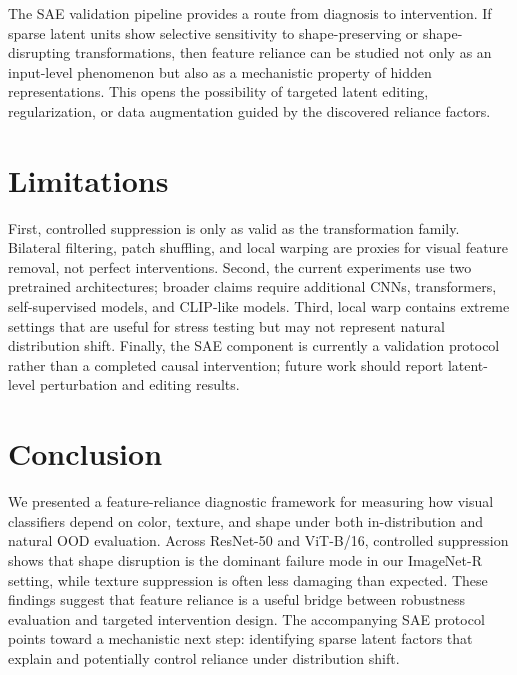 \documentclass[letterpaper]{article}
\begin{document}
The SAE validation pipeline provides a route from diagnosis to intervention.
If sparse latent units show selective sensitivity to shape-preserving or
shape-disrupting transformations, then feature reliance can be studied not only
as an input-level phenomenon but also as a mechanistic property of hidden
representations. This opens the possibility of targeted latent editing,
regularization, or data augmentation guided by the discovered reliance factors.

\section{Limitations}

First, controlled suppression is only as valid as the transformation family.
Bilateral filtering, patch shuffling, and local warping are proxies for visual
feature removal, not perfect interventions. Second, the current experiments use
two pretrained architectures; broader claims require additional CNNs,
transformers, self-supervised models, and CLIP-like models. Third, local warp
contains extreme settings that are useful for stress testing but may not
represent natural distribution shift. Finally, the SAE component is currently a
validation protocol rather than a completed causal intervention; future work
should report latent-level perturbation and editing results.

\section{Conclusion}

We presented a feature-reliance diagnostic framework for measuring how visual
classifiers depend on color, texture, and shape under both in-distribution and
natural OOD evaluation. Across ResNet-50 and ViT-B/16, controlled suppression
shows that shape disruption is the dominant failure mode in our ImageNet-R
setting, while texture suppression is often less damaging than expected. These
findings suggest that feature reliance is a useful bridge between robustness
evaluation and targeted intervention design. The accompanying SAE protocol
points toward a mechanistic next step: identifying sparse latent factors that
explain and potentially control reliance under distribution shift.


\end{document}

